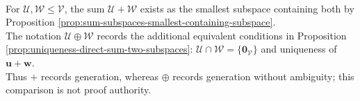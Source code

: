 \begin{perspective} \label{per:sum-versus-direct-sum-existence} \\
For $\mathcal{U},\mathcal{W}\leq\mathcal{V}$, the sum $\mathcal{U}+\mathcal{W}$ exists as the smallest subspace containing both by Proposition \ref{prop:sum-subspaces-smallest-containing-subspace}.\\
The notation $\mathcal{U}\oplus\mathcal{W}$ records the additional equivalent conditions in Proposition \ref{prop:uniqueness-direct-sum-two-subspaces}: $\mathcal{U}\cap\mathcal{W}=\{\mathbf{0}_{\mathcal{V}}\}$ and uniqueness of $\mathbf{u}+\mathbf{w}$.\\
Thus $+$ records generation, whereas $\oplus$ records generation without ambiguity; this comparison is not proof authority.
\end{perspective}

